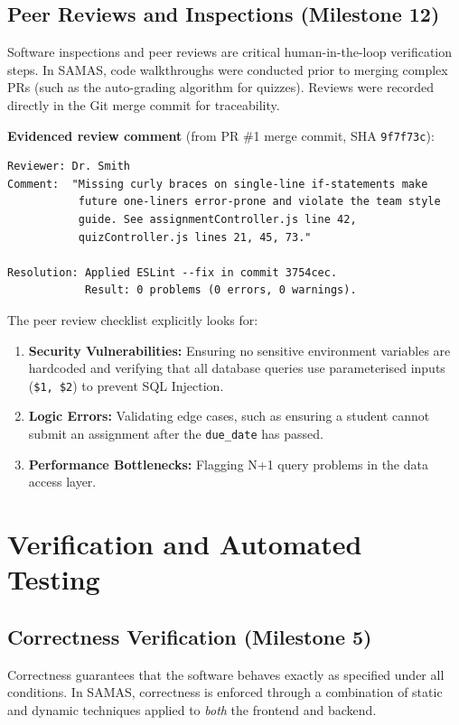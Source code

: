 \documentclass[12pt, a4paper]{report}
\begin{document}
\section{Peer Reviews and Inspections (Milestone 12)}
Software inspections and peer reviews are critical human-in-the-loop verification steps. In SAMAS, code walkthroughs were conducted prior to merging complex PRs (such as the auto-grading algorithm for quizzes). Reviews were recorded directly in the Git merge commit for traceability.

\textbf{Evidenced review comment} (from PR \#1 merge commit, SHA \texttt{9f7f73c}):
\begin{lstlisting}[style=output_style, caption={Peer review comment recorded in PR \#1 merge commit}]
Reviewer: Dr. Smith
Comment:  "Missing curly braces on single-line if-statements make
           future one-liners error-prone and violate the team style
           guide. See assignmentController.js line 42,
           quizController.js lines 21, 45, 73."

Resolution: Applied ESLint --fix in commit 3754cec.
            Result: 0 problems (0 errors, 0 warnings).
\end{lstlisting}

The peer review checklist explicitly looks for:
\begin{enumerate}[noitemsep]
    \item \textbf{Security Vulnerabilities:} Ensuring no sensitive environment variables are hardcoded and verifying that all database queries use parameterised inputs (\texttt{\$1, \$2}) to prevent SQL Injection.
    \item \textbf{Logic Errors:} Validating edge cases, such as ensuring a student cannot submit an assignment after the \texttt{due\_date} has passed.
    \item \textbf{Performance Bottlenecks:} Flagging N+1 query problems in the data access layer.
\end{enumerate}

\chapter{Verification and Automated Testing}

\section{Correctness Verification (Milestone 5)}
Correctness guarantees that the software behaves exactly as specified under all conditions. In SAMAS, correctness is enforced through a combination of static and dynamic techniques applied to \emph{both} the frontend and backend.
\end{document}
